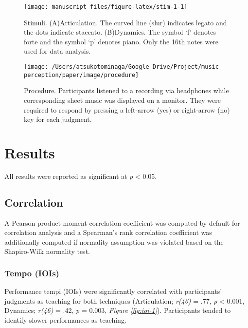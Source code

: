\documentclass[
  man,floatsintext]{apa6}
\begin{document}
\begin{figure}
\texttt{[image: manuscript\_files/figure-latex/stim-1-1]} \caption{\label{fig:stim1}Stimuli. (A)Articulation. The curved line (slur) indicates legato and the dots indicate staccato. (B)Dynamics. The symbol `f' denotes forte and the symbol `p' denotes piano. Only the 16th notes were used for data analysis.}\label{fig:stim-1}
\end{figure}

\begin{figure}
\texttt{[image: /Users/atsukotominaga/Google Drive/Project/music-perception/paper/image/procedure]} \caption{\label{fig:procedure1}Procedure. Participants listened to a recording via headphones while corresponding sheet music was displayed on a monitor. They were required to respond by pressing a left-arrow (yes) or right-arrow (no) key for each judgment.}\label{fig:procedure-1}
\end{figure}

\clearpage

\hypertarget{results}{%
\section{Results}\label{results}}

All results were reported as significant at \emph{p} \textless{} 0.05.

\hypertarget{correlation}{%
\subsection{Correlation}\label{correlation}}

A Pearson product-moment correlation coefficient was computed by default for correlation analysis and a Spearman's rank correlation coefficient was additionally computed if normality assumption was violated based on the Shapiro-Wilk normality test.

\hypertarget{tempo-iois}{%
\subsubsection{Tempo (IOIs)}\label{tempo-iois}}

Performance tempi (IOIs) were significantly correlated with participants' judgments as teaching for both techniques (Articulation; \emph{r(46)} = .77, \emph{p} \textless{} 0.001, Dynamics; \emph{r(46)} = .42, \emph{p} = 0.003, \emph{Figure \ref{fig:ioi-1}}). Participants tended to identify slower performances as teaching.
\end{document}
